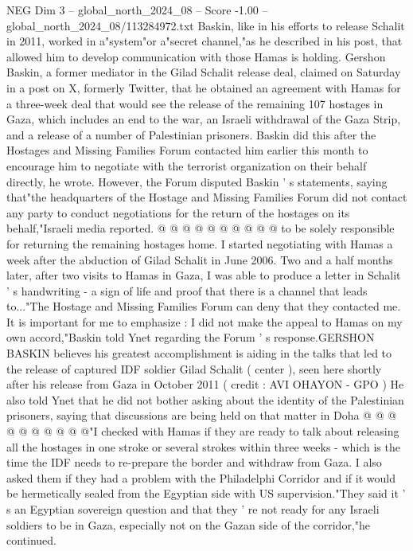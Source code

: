\begin{textsample}{NEG Dim 3 – global\_north\_2024\_08 – Score -1.00 – global\_north\_2024\_08/113284972.txt}  \label{ex:f3_neg_319}
Baskin, like in his efforts to release Schalit in 2011, worked in a"system"or a"secret channel,"as he described in his post, that allowed him to develop communication with those Hamas is holding.
Gershon Baskin, a former mediator in the Gilad Schalit release deal, claimed on Saturday in a post on X, formerly Twitter, that he obtained an agreement with Hamas for a three-week deal that would see the release of the remaining 107 hostages in Gaza, which includes an end to the war, an Israeli withdrawal of the Gaza Strip, and a release of a number of Palestinian prisoners.
Baskin did this after the Hostages and Missing Families Forum contacted him earlier this month to encourage him to negotiate with the terrorist organization on their behalf directly, he wrote.
However, the Forum disputed Baskin ' s statements, saying that"the headquarters of the Hostage and Missing Families Forum did not contact any party to conduct negotiations for the return of the hostages on its behalf,"Israeli media reported. @ @ @ @ @ @ @ @ @ @ to be solely responsible for returning the remaining hostages home.
I started negotiating with Hamas a week after the abduction of Gilad Schalit in June 2006.
Two and a half months later, after two visits to Hamas in Gaza, I was able to produce a letter in Schalit ' s handwriting - a sign of life and proof that there is a channel that leads to..."The Hostage and Missing Families Forum can deny that they contacted me.
It is important for me to emphasize : I did not make the appeal to Hamas on my own accord,"Baskin told Ynet regarding the Forum ' s response.GERSHON BASKIN believes his greatest accomplishment is aiding in the talks that led to the release of captured IDF soldier Gilad Schalit ( center ), seen here shortly after his release from Gaza in October 2011 ( credit : AVI OHAYON - GPO ) He also told Ynet that he did not bother asking about the identity of the Palestinian prisoners, saying that discussions are being held on that matter in Doha @ @ @ @ @ @ @ @ @ @"I checked with Hamas if they are ready to talk about releasing all the hostages in one stroke or several strokes within three weeks - which is the time the IDF needs to re-prepare the border and withdraw from Gaza.
I also asked them if they had a problem with the Philadelphi Corridor and if it would be hermetically sealed from the Egyptian side with US supervision."They said it ' s an Egyptian sovereign question and that they ' re not ready for any Israeli soldiers to be in Gaza, especially not on the Gazan side of the corridor,"he continued.

\end{textsample}
